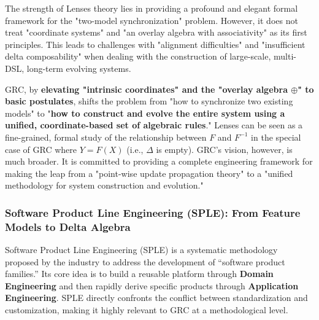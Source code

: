 \documentclass[11pt]{article}
\begin{document}
The strength of Lenses theory lies in providing a profound and elegant formal framework for the "two-model synchronization" problem. However, it does not treat "coordinate systems" and "an overlay algebra with associativity" as its first principles. This leads to challenges with "alignment difficulties" and "insufficient delta composability" when dealing with the construction of large-scale, multi-DSL, long-term evolving systems.

GRC, by \textbf{elevating "intrinsic coordinates" and the "overlay algebra $\oplus$" to basic postulates}, shifts the problem from "how to synchronize two existing models" to "\textbf{how to construct and evolve the entire system using a unified, coordinate-based set of algebraic rules}." Lenses can be seen as a fine-grained, formal study of the relationship between $F$ and $F^{-1}$ in the special case of GRC where $Y = F(X)$ (i.e., $\Delta$ is empty). GRC's vision, however, is much broader. It is committed to providing a complete engineering framework for making the leap from a "point-wise update propagation theory" to a "unified methodology for system construction and evolution."

\subsubsection{Software Product Line Engineering (SPLE): From Feature Models to Delta Algebra}
\label{sec:sple}

Software Product Line Engineering (SPLE) \cite{pohl2005} is a systematic methodology proposed by the industry to address the development of ``software product families.'' Its core idea is to build a reusable platform through \textbf{Domain Engineering} and then rapidly derive specific products through \textbf{Application Engineering}. SPLE directly confronts the conflict between standardization and customization, making it highly relevant to GRC at a methodological level.
\end{document}
